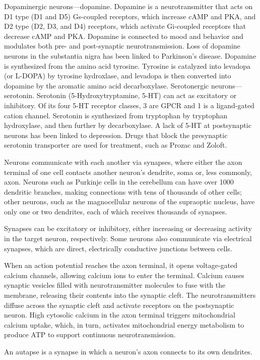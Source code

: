 \documentclass[]{book}
\begin{document}
Dopaminergic neurons---dopamine. Dopamine is a neurotransmitter that acts on D1 type (D1 and D5) Gs-coupled receptors, which increase cAMP and PKA, and D2 type (D2, D3, and D4) receptors, which activate Gi-coupled receptors that decrease cAMP and PKA. Dopamine is connected to mood and behavior and modulates both pre- and post-synaptic neurotransmission. Loss of dopamine neurons in the substantia nigra has been linked to Parkinson's disease. Dopamine is synthesized from the amino acid tyrosine. Tyrosine is catalyzed into levadopa (or L-DOPA) by tyrosine hydroxlase, and levadopa is then converted into dopamine by the aromatic amino acid decarboxylase.
Serotonergic neurons---serotonin. Serotonin (5-Hydroxytryptamine, 5-HT) can act as excitatory or inhibitory. Of its four 5-HT receptor classes, 3 are GPCR and 1 is a ligand-gated cation channel. Serotonin is synthesized from tryptophan by tryptophan hydroxylase, and then further by decarboxylase. A lack of 5-HT at postsynaptic neurons has been linked to depression. Drugs that block the presynaptic serotonin transporter are used for treatment, such as Prozac and Zoloft.

Neurons communicate with each another via synapses, where either the axon terminal of one cell contacts another neuron's dendrite, soma or, less commonly, axon. Neurons such as Purkinje cells in the cerebellum can have over 1000 dendritic branches, making connections with tens of thousands of other cells; other neurons, such as the magnocellular neurons of the supraoptic nucleus, have only one or two dendrites, each of which receives thousands of synapses.

Synapses can be excitatory or inhibitory, either increasing or decreasing activity in the target neuron, respectively. Some neurons also communicate via electrical synapses, which are direct, electrically conductive junctions between cells.

When an action potential reaches the axon terminal, it opens voltage-gated calcium channels, allowing calcium ions to enter the terminal. Calcium causes synaptic vesicles filled with neurotransmitter molecules to fuse with the membrane, releasing their contents into the synaptic cleft. The neurotransmitters diffuse across the synaptic cleft and activate receptors on the postsynaptic neuron. High cytosolic calcium in the axon terminal triggers mitochondrial calcium uptake, which, in turn, activates mitochondrial energy metabolism to produce ATP to support continuous neurotransmission.

An autapse is a synapse in which a neuron's axon connects to its own dendrites.
\end{document}
